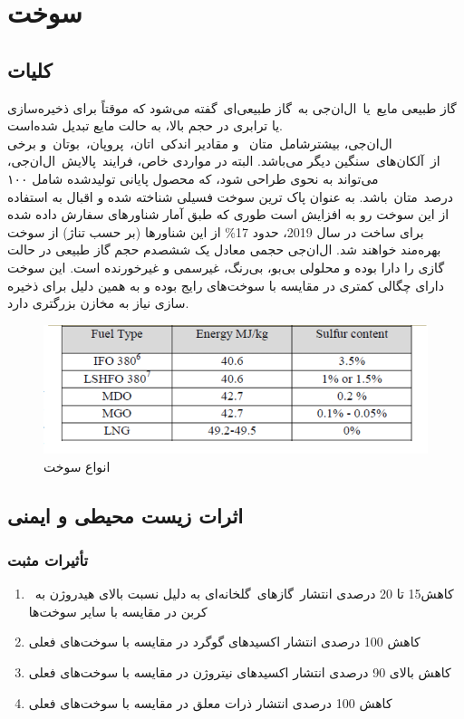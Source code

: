 \begin{center}
	
\end{center}\chapter{سوخت }
\section{کلیات}
گاز طبیعی مایع یا ال‌ان‌جی 
 به گاز طبیعی‌ای گفته می‌شود که موقتاً برای ذخیره‌سازی یا ترابری در حجم بالا، به حالت مایع تبدیل شده‌است.
 \\
 ال‌ان‌جی، بیشترشامل متان 
 و مقادیر اندکی اتان، پروپان، بوتان و برخی از آلکان‌های سنگین دیگر می‌باشد. البته در مواردی خاص، فرایند پالایش ال‌ان‌جی، می‌تواند به نحوی طراحی شود، که محصول پایانی تولیدشده شامل ۱۰۰ درصد متان باشد. 
  به عنوان پاک ترین سوخت فسیلی شناخته شده و اقبال به استفاده از این سوخت رو به افزایش است طوری که طبق آمار شناورهای سفارش داده شده برای ساخت در سال 2019، حدود
   17\%  از این شناورها (بر حسب تناژ) از سوخت 
   بهره‌مند خواهند شد.
ال‌ان‌جی حجمی معادل یک ششصدم حجم گاز طبیعی در حالت گازی را دارا بوده و محلولی بی‌بو، بی‌رنگ، غیرسمی و غیرخورنده است. این سوخت دارای چگالی کمتری در مقایسه با سوخت‌های رایج بوده و به همین دلیل برای ذخیره سازی نیاز به مخازن بزرگتری دارد.
\begin{figure}[!h]
	\centering
	\includegraphics[width=15cm]{Figures/LNG/Fuel Type.png}
	\caption{انواع سوخت}\label{fuel type}
\end{figure}
\newpage
\section{اثرات زیست محیطی و ایمنی}
\subsection{تأثیرات مثبت}
\begin{enumerate}
	\item  کاهش15 تا 20 درصدی انتشار گازهای گلخانه‌ای  به دلیل نسبت بالای هیدروژن به کربن در مقایسه با سایر سوخت‌ها
	\item کاهش 100 درصدی انتشار اکسیدهای گوگرد  در مقایسه با سوخت‌های فعلی
	\item کاهش بالای 90 درصدی انتشار اکسیدهای نیتروژن  در مقایسه با سوخت‌های فعلی
	\item کاهش 100 درصدی انتشار ذرات معلق  در مقایسه با سوخت‌های فعلی
\end{enumerate}
